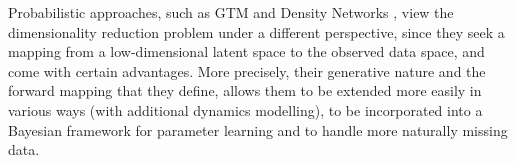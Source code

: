 Probabilistic approaches, such as GTM \citep{Bishop:gtm_ncomp98} and Density Networks \citep{MacKay:wondsa95}, view the dimensionality
reduction problem under a different perspective, since they seek a mapping from a low-dimensional latent space
to the observed data space, and come with certain advantages. More precisely, their generative nature and the forward mapping
that they define, allows them to be 
extended more easily in various ways (\eg with additional dynamics modelling), to be incorporated into a Bayesian 
framework for parameter learning and to handle more naturally missing data.







